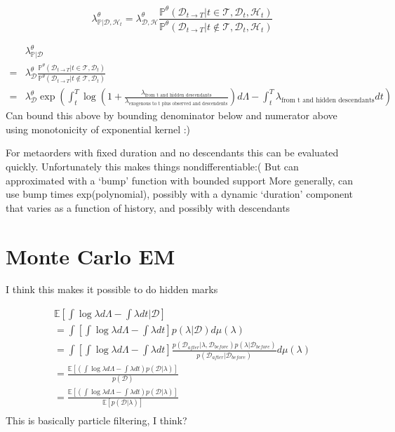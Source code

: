 \documentclass[honours,12pt]{unswthesis}
\numberwithin{equation}{section}
\begin{document}
$$\lambda_{\mathbb{P} \vert \mathcal{D}, \mathcal{H}_t}^\theta = \lambda_{\mathcal{D},\mathcal{H}}^\theta \frac{\mathbb{P}^\theta(\mathcal{D}_{t\to T}\vert t\in\mathcal{T}, \mathcal{D}_t, \mathcal{H}_t)}{\mathbb{P}^\theta(\mathcal{D}_{t\to T}\vert t\not\in\mathcal{T}, \mathcal{D}_t, \mathcal{H}_t)}$$

\begin{equation*}
	\begin{align}
		& \lambda_{\mathbb{P} \vert \mathcal{D}}^\theta \\
		= & \lambda_{\mathcal{D}}^\theta \frac{\mathbb{P}^\theta(\mathcal{D}_{t\to T}\vert t\in\mathcal{T}, \mathcal{D}_t)}{\mathbb{P}^\theta(\mathcal{D}_{t\to T}\vert t\not\in\mathcal{T}, \mathcal{D}_t)} \\
		= & \lambda_\mathcal{D}^\theta \exp\left( \int_t^T \log\left(1 + \frac{\lambda_\text{from t and hidden descendants}}{\lambda_\text{exogenous to t plus observed and descendents}}\right) d\Lambda - \int_t^T \lambda_\text{from t and hidden descendants}dt \right)
	\end{align}
\end{equation*}
Can bound this above by bounding denominator below and numerator above using monotonicity of exponential kernel :)


For metaorders with fixed duration and no descendants this can be evaluated quickly. Unfortunately this makes things nondifferentiable:( But can approximated with a `bump' function with bounded support
More generally, can use bump times exp(polynomial), possibly with a dynamic `duration' component that varies as a function of history, and possibly with descendants

\section{Monte Carlo EM}
I think this makes it possible to do hidden marks

\begin{equation*}
	\begin{align}
		\mathbb{E}\left[\int \log\lambda d\Lambda - \int \lambda dt \vert \mathcal{D}\right] \\
		= \int \left[\int \log\lambda d\Lambda - \int \lambda dt\right] p(\lambda \vert\mathcal{D})d\mu(\lambda) \\
		= \int \left[\int \log\lambda d\Lambda - \int \lambda dt\right] \frac{p(\mathcal{D}_{after} \vert \lambda,\mathcal{D}_{before})p(\lambda \vert \mathcal{D}_{before})}{p(\mathcal{D}_{after}\vert \mathcal{D}_{before})}d\mu(\lambda) \\
		= \frac{\mathbb{E} \left[\left(\int \log\lambda d\Lambda - \int \lambda dt\right)p(\mathcal{D}\vert\lambda)\right]}{p(\mathcal{D})} \\
		= \frac{\mathbb{E} \left[\left(\int \log\lambda d\Lambda - \int \lambda dt\right)p(\mathcal{D}\vert\lambda)\right]}{\mathbb{E}\left[p(\mathcal{D}\vert\lambda)\right]} \\
	\end{align}
\end{equation*}
This is basically particle filtering, I think?
\end{document}
